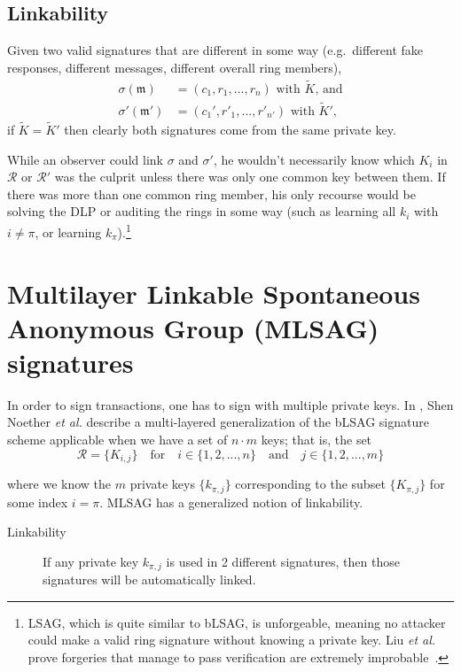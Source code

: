 \subsection*{Linkability}

Given two valid signatures that are different in some way (e.g.\ different fake responses, different messages, different overall ring members),\vspace{.07cm}
\begin{align*}
	\sigma(\mathfrak{m})   &= (c_1, r_1, ..., r_n)\textrm{ with } \tilde{K}\textrm{, and}\\
	\sigma'(\mathfrak{m}')  &= (c_1', r'_1, ..., r'_{n'})\textrm{ with } \tilde{K}'\textrm{,}
\end{align*}
\quad if \(\tilde{K} =  \tilde{K}'\) then clearly both signatures come from the same private key.%

While an observer could link $\sigma$ and $\sigma'$, he wouldn't necessarily know which $K_i$ in $\mathcal{R}$ or $\mathcal{R}'$ was the culprit unless there was only one common key between them. If there was more than one common ring member, his only recourse would be solving the DLP or auditing the rings in some way (such as learning all $k_i$ with $i \neq \pi$, or learning $k_\pi$).\footnote{\label{lsag_unforgeable_note}LSAG, which is quite similar to bLSAG, is unforgeable, meaning no attacker could make a valid ring signature without knowing a private key. Liu {\em et al.} prove forgeries that manage to pass verification are extremely improbable~\cite{Liu2004}.}



\section{Multilayer Linkable Spontaneous Anonymous Group (MLSAG) signatures}
\label{sec:MLSAG}

In order to sign transactions, one has to sign with multiple private keys. In \cite{MRL-0005-ringct}, Shen Noether {\em et al.} describe a multi-layered generalization of the bLSAG signature scheme applicable when we have a set of \(n \cdot m\) keys; that is, the set\vspace{.175cm}
\[\mathcal{R} = \{K_{i,j}\}  \quad \textrm{for} \quad  i \in \{1, 2, ..., n\} \quad \textrm{and} \quad j \in \{1, 2, ..., m\}\]

where we know the $m$ private keys \(\{k_{\pi, j}\}\) corresponding to the subset \(\{K_{\pi, j}\}\) for some index \(i = \pi\). MLSAG has a generalized notion of linkability.
\begin{description}
	\item[Linkability] If any private key \(k_{\pi, j}\) is used in 2 different signatures, then those signatures will be automatically linked.
\end{description}


